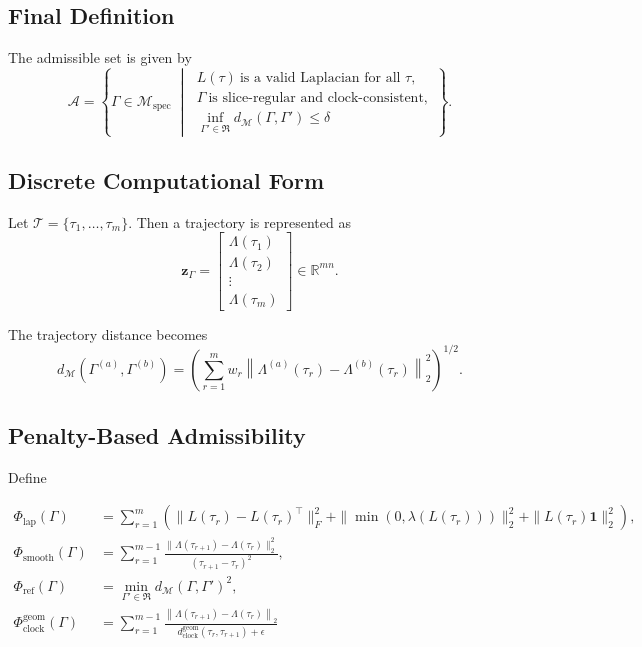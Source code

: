 \documentclass[11pt,a4paper]{article}
\theoremstyle{definition}
\theoremstyle{remark}
\begin{document}
\subsection{Final Definition}

The admissible set is given by
\begin{equation}
\mathcal{A}
=
\left\{
\Gamma \in \mathcal{M}_{\mathrm{spec}}
\;\middle|\;
\begin{array}{l}
L(\tau)\ \text{is a valid Laplacian for all }\tau,\\[4pt]
\Gamma\ \text{is slice-regular and clock-consistent},\\[4pt]
\inf_{\Gamma' \in \mathfrak R} d_{\mathcal M}(\Gamma,\Gamma') \le \delta
\end{array}
\right\}.
\end{equation}

\subsection{Discrete Computational Form}

Let $\mathcal{T} = \{\tau_1,\dots,\tau_m\}$. Then a trajectory is represented as
\begin{equation}
\mathbf{z}_\Gamma
=
\begin{bmatrix}
\Lambda(\tau_1) \\
\Lambda(\tau_2) \\
\vdots \\
\Lambda(\tau_m)
\end{bmatrix}
\in \mathbb{R}^{mn}.
\end{equation}

The trajectory distance becomes
\begin{equation}
d_{\mathcal{M}}(\Gamma^{(a)},\Gamma^{(b)})
=
\left(
\sum_{r=1}^m
w_r
\left\|
\Lambda^{(a)}(\tau_r)-\Lambda^{(b)}(\tau_r)
\right\|_2^2
\right)^{1/2}.
\end{equation}

\subsection{Penalty-Based Admissibility}

Define

\begin{align}
\Phi_{\mathrm{lap}}(\Gamma)
&=
\sum_{r=1}^m
\left(
\|L(\tau_r)-L(\tau_r)^\top\|_F^2
+
\|\min(0,\lambda(L(\tau_r)))\|_2^2
+
\|L(\tau_r)\mathbf{1}\|_2^2
\right), \\[6pt]
\Phi_{\mathrm{smooth}}(\Gamma)
&=
\sum_{r=1}^{m-1}
\frac{
\|\Lambda(\tau_{r+1})-\Lambda(\tau_r)\|_2^2
}{
(\tau_{r+1}-\tau_r)^2
}, \\[6pt]
\Phi_{\mathrm{ref}}(\Gamma)
&=
\min_{\Gamma' \in \mathfrak R}
d_{\mathcal M}(\Gamma,\Gamma')^2, \\[6pt]
\Phi_{\mathrm{clock}}^{\mathrm{geom}}(\Gamma)&=\sum_{r=1}^{m-1} \frac{\left\|\Lambda\left(\tau_{r+1}\right)-\Lambda\left(\tau_r\right)\right\|_2}{d_{\mathrm{clock}}^{\mathrm{geom}}\left(\tau_r, \tau_{r+1}\right)+\epsilon}
\end{align}
\end{document}
